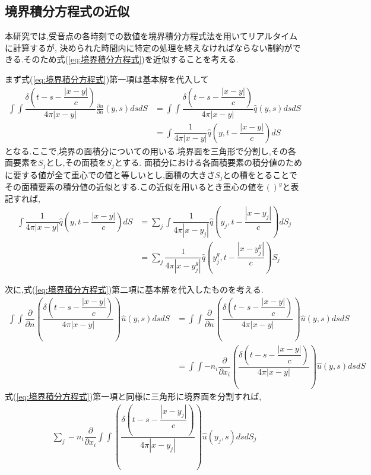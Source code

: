 \documentclass[dvipdfmx]{ampbt}
\begin{document}
\subsection{境界積分方程式の近似}
本研究では,受音点の各時刻での数値を境界積分方程式法を用いてリアルタイムに計算するが,%
決められた時間内に特定の処理を終えなければならない制約ができる.そのため式(\ref{eq:境界積分方程式})を近似することを考える.\par
まず式(\ref{eq:境界積分方程式})第一項は基本解を代入して
\begin{align}
\int\!\!\!\int \dfrac{\delta(t-s-\dfrac{|x-y|}{c})}{4\pi|x-y|} \frac{\partial u}{\partial n}(y,s)dsdS
&= \int\!\!\!\int \dfrac{\delta(t-s-\dfrac{|x-y|}{c})}{4\pi|x-y|} \hat{q}(y,s)dsdS\\
&= \int\!\!\! \dfrac{1}{4\pi|x-y|} \hat{q}(y,t-\dfrac{|x-y|}{c})dS
\end{align}
となる.ここで,境界の面積分についての用いる.境界面を三角形で分割し,その各面要素を$S_j$とし,その面積を$S_j$とする.
面積分における各面積要素の積分値のために要する値が全て重心での値と等しいとし,面積の大きさ$S_j$との積をとることで
その面積要素の積分値の近似とする.この近似を用いるとき重心の値を$( )^g$と表記すれば,
\begin{align}
\int\!\!\! \dfrac{1}{4\pi|x-y|} \hat{q}(y,t-\dfrac{|x-y|}{c})dS &= \sum_j \int\!\!\! \dfrac{1}{4\pi|x-y_j|} \hat{q}(y_j,t-\dfrac{|x-y_j|}{c})dS_j \nonumber \\
&=\sum_j \dfrac{1}{4\pi|x-y_j^g|} \hat{q}(y_j^g,t-\dfrac{|x-y_j^g|}{c})S_j
\end{align}
\par
次に,式(\ref{eq:境界積分方程式})第二項に基本解を代入したものを考える.
\begin{align}
\int\!\!\!\int \dfrac{\partial}{\partial n}\left( \dfrac{\delta(t-s-\dfrac{|x-y|}{c})}{4\pi|x-y|} \right) \hat{u}(y,s) ds dS
&= \int\!\!\!\int \dfrac{\partial}{\partial n}\left( \dfrac{\delta(t-s-\dfrac{|x-y|}{c})}{4\pi|x-y|} \right) \hat{u}(y,s) ds dS \nonumber \\
&= \int\!\!\!\int -n_i\dfrac{\partial}{\partial x_i}\left( \dfrac{\delta(t-s-\dfrac{|x-y|}{c})}{4\pi|x-y|} \right) \hat{u}(y,s) ds dS
\end{align}
式(\ref{eq:境界積分方程式})第一項と同様に三角形に境界面を分割すれば,
\begin{align}
\sum_j -n_i\dfrac{\partial}{\partial x_i}\int\!\!\!\int \left( \dfrac{\delta(t-s-\dfrac{|x-y_j|}{c})}{4\pi|x-y_j|} \right) \hat{u}(y_j,s) ds dS_j
\end{align}
\end{document}
